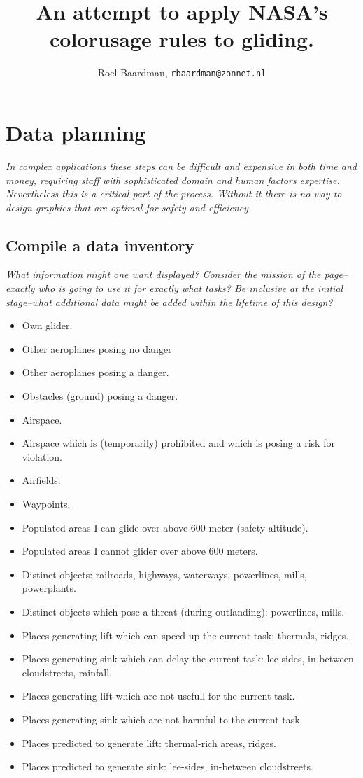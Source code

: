 \documentclass{article}
\newcommand{\myquote}[1]
{
	\textit{#1}
}
\begin{document}
\title{An attempt to apply NASA's colorusage rules to gliding.}
\author{Roel Baardman, \nolinkurl{rbaardman@zonnet.nl}}
\maketitle
\newpage
\tableofcontents
\newpage

\section{Data planning}
\myquote{In complex applications these steps can be difficult and expensive in both time and money, requiring staff with sophisticated domain and human factors expertise. Nevertheless this is a critical part of the process. Without it there is no way to design graphics that are optimal for safety and efficiency.}
\subsection{Compile a data inventory}
\myquote{What information might one want displayed? Consider the mission of the page--exactly who is going to use it for exactly what tasks? Be inclusive at the initial stage--what additional data might be added within the lifetime of this design?}
\begin{itemize}
\item Own glider.
\item Other aeroplanes posing no danger
\item Other aeroplanes posing a danger.
\item Obstacles (ground) posing a danger.
\item Airspace.
\item Airspace which is (temporarily) prohibited and which is posing a risk for violation.
\item Airfields.
\item Waypoints.
\item Populated areas I can glide over above 600 meter (safety altitude).
\item Populated areas I cannot glider over above 600 meters.
\item Distinct objects: railroads, highways, waterways, powerlines, mills, powerplants.
\item Distinct objects which pose a threat (during outlanding): powerlines, mills.
\item Places generating lift which can speed up the current task: thermals, ridges.
\item Places generating sink which can delay the current task: lee-sides, in-between cloudstreets, rainfall.
\item Places generating lift which are not usefull for the current task.
\item Places generating sink which are not harmful to the current task.
\item Places predicted to generate lift: thermal-rich areas, ridges.
\item Places predicted to generate sink: lee-sides, in-between cloudstreets.
\end{itemize}
\end{document}
